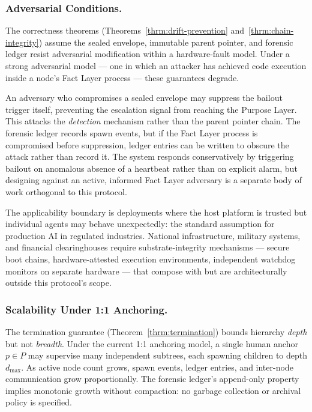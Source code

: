 \subsubsection{Adversarial Conditions.}
\label{sec:limitations-adversarial}

The correctness theorems (Theorems~\ref{thrm:drift-prevention} and~\ref{thrm:chain-integrity}) assume the sealed envelope, immutable parent pointer, and forensic ledger resist adversarial modification within a hardware-fault model. Under a strong adversarial model — one in which an attacker has achieved code execution inside a node's Fact Layer process — these guarantees degrade.

An adversary who compromises a sealed envelope may suppress the bailout trigger itself, preventing the escalation signal from reaching the Purpose Layer. This attacks the \emph{detection} mechanism rather than the parent pointer chain. The forensic ledger records spawn events, but if the Fact Layer process is compromised before suppression, ledger entries can be written to obscure the attack rather than record it. The system responds conservatively by triggering bailout on anomalous absence of a heartbeat rather than on explicit alarm, but designing against an active, informed Fact Layer adversary is a separate body of work orthogonal to this protocol.

The applicability boundary is deployments where the host platform is trusted but individual agents may behave unexpectedly: the standard assumption for production AI in regulated industries. National infrastructure, military systems, and financial clearinghouses require substrate-integrity mechanisms — secure boot chains, hardware-attested execution environments, independent watchdog monitors on separate hardware — that compose with but are architecturally outside this protocol's scope.

\subsubsection{Scalability Under 1:1 Anchoring.}
\label{sec:limitations-scalability}

The termination guarantee (Theorem~\ref{thrm:termination}) bounds hierarchy \emph{depth} but not \emph{breadth}. Under the current 1:1 anchoring model, a single human anchor $p \in P$ may supervise many independent subtrees, each spawning children to depth $d_{\max}$. As active node count grows, spawn events, ledger entries, and inter-node communication grow proportionally. The forensic ledger's append-only property implies monotonic growth without compaction: no garbage collection or archival policy is specified.

